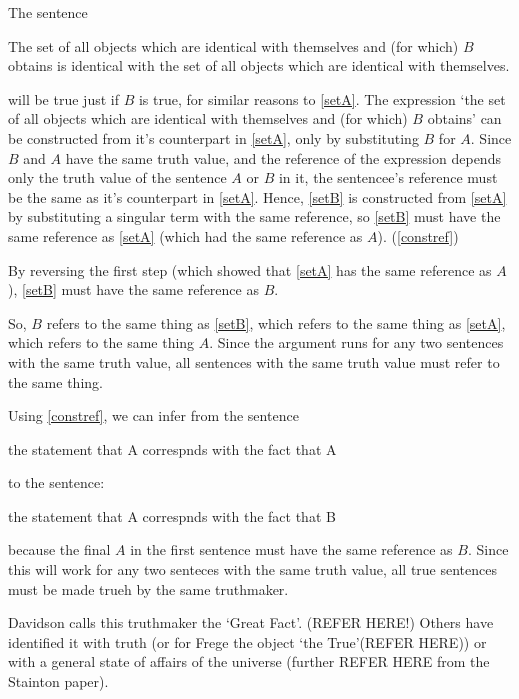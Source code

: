 The sentence 

	\begin{example} \label{setB}
	The set of all objects which are identical with themselves and (for which) $B$ obtains is identical with the set of all objects which are identical with themselves.
	\end{example}

will be true just if $B$ is true, for similar reasons to \ref{setA}.
The expression `the set of all objects which are identical with themselves and (for which) $B$ obtains' can be constructed from it's counterpart in \ref{setA}, only by substituting $B$ for $A$.
Since $B$ and $A$ have the same truth value, and the reference of the expression depends only the truth value of the sentence $A$ or $B$ in it, the sentencee's reference must be the same as it's counterpart in \ref{setA}.
Hence, \ref{setB} is constructed from \ref{setA} by substituting a singular term with the same reference, so \ref{setB} must have the same reference as \ref{setA} (which had the same reference as $A$). 
(\ref{constref})

By reversing the first step (which showed that \ref{setA} has the same reference as $A$), \ref{setB} must have the same reference as $B$.

So, $B$ refers to the same thing as \ref{setB}, which refers to the same thing as \ref{setA}, which refers to the same thing $A$.
Since the argument runs for any two sentences with the same truth value, all sentences with the same truth value must refer to the same thing.

Using \ref{constref}, we can infer from the sentence

	\begin{example} \label{stateA}
	the statement that A correspnds with the fact that A
	\end{example}

to the sentence:

	\begin{example} \label{stateB}
	the statement that A correspnds with the fact that B
	\end{example}

because the final $A$ in the first sentence must have the same reference as $B$.
Since this will work for any two senteces with the same truth value, all true sentences must be made trueh by the same truthmaker.

Davidson calls this truthmaker the `Great Fact'.
(REFER HERE!)
Others have identified it with truth (or for Frege the object `the True'(REFER HERE)) or with a general state of affairs of the universe (further REFER HERE from the Stainton paper).

